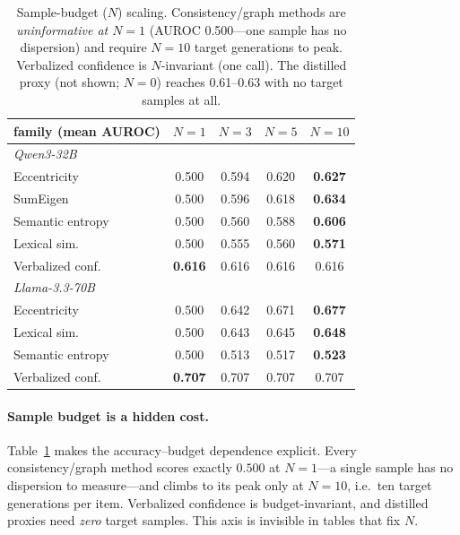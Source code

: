 \documentclass[11pt]{article}
\newcommand{\best}[1]{\textbf{#1}}
\begin{document}
\begin{table}[t]\centering\small
\setlength{\tabcolsep}{4pt}
\begin{tabular}{l cccc}
\toprule
family (mean AUROC) & $N{=}1$ & $N{=}3$ & $N{=}5$ & $N{=}10$\\
\midrule
\multicolumn{5}{l}{\emph{Qwen3-32B}}\\
Eccentricity      & 0.500 & 0.594 & 0.620 & \best{0.627}\\
SumEigen          & 0.500 & 0.596 & 0.618 & \best{0.634}\\
Semantic entropy  & 0.500 & 0.560 & 0.588 & \best{0.606}\\
Lexical sim.      & 0.500 & 0.555 & 0.560 & \best{0.571}\\
Verbalized conf.  & \best{0.616} & 0.616 & 0.616 & 0.616\\
\midrule
\multicolumn{5}{l}{\emph{Llama-3.3-70B}}\\
Eccentricity      & 0.500 & 0.642 & 0.671 & \best{0.677}\\
Lexical sim.      & 0.500 & 0.643 & 0.645 & \best{0.648}\\
Semantic entropy  & 0.500 & 0.513 & 0.517 & \best{0.523}\\
Verbalized conf.  & \best{0.707} & 0.707 & 0.707 & 0.707\\
\bottomrule
\end{tabular}
\caption{Sample-budget ($N$) scaling. Consistency/graph methods are \emph{uninformative
at $N{=}1$} (AUROC 0.500---one sample has no dispersion) and require $N{=}10$ target
generations to peak. Verbalized confidence is $N$-invariant (one call). The distilled
proxy (not shown; $N{=}0$) reaches 0.61--0.63 with no target samples at all.}
\label{tab:nsweep}
\end{table}

\paragraph{Sample budget is a hidden cost.} Table~\ref{tab:nsweep} makes the
accuracy--budget dependence explicit. Every consistency/graph method scores exactly
$0.500$ at $N{=}1$---a single sample has no dispersion to measure---and climbs to its
peak only at $N{=}10$, i.e.\ ten target generations per item. Verbalized confidence is
budget-invariant, and distilled proxies need \emph{zero} target samples. This axis is
invisible in tables that fix $N$.
\end{document}
